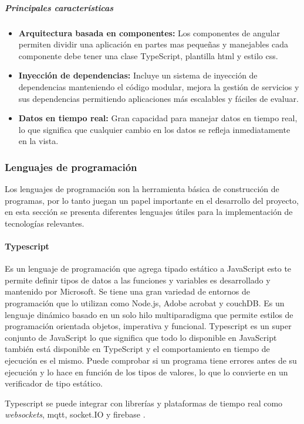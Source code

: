 \subparagraph{Principales características}
\begin{itemize}
    \item \textbf{Arquitectura basada en componentes:} Los componentes de angular permiten dividir una aplicación en partes mas pequeñas y manejables cada componente debe tener una clase TypeScript, plantilla \acrfull{html} y estilo \acrshort{css}.
    \item \textbf{Inyección de dependencias:} Incluye un sistema de inyección de dependencias manteniendo el código modular, mejora la gestión de servicios y sus dependencias permitiendo aplicaciones más escalables y fáciles de evaluar.
    \item \textbf{Datos en tiempo real:} Gran capacidad para manejar datos en tiempo real, lo que significa que cualquier cambio en los datos se refleja inmediatamente en la vista.
\end{itemize}

\subsubsection{Lenguajes de programación}
Los lenguajes de programación son la herramienta básica de construcción de programas, por lo tanto juegan un papel importante en el desarrollo del proyecto, en esta sección se presenta diferentes lenguajes útiles para la implementación de tecnologías relevantes.
\paragraph{Typescript}
Es un lenguaje de programación que agrega tipado estático a JavaScript esto te permite definir tipos de datos a las funciones y variables es desarrollado y mantenido por Microsoft. Se tiene una gran variedad de entornos de programación que lo utilizan como Node.js, Adobe acrobat y couchDB. Es un lenguaje dinámico basado en un solo hilo multiparadigma que permite estilos de programación orientada objetos, imperativa y funcional. Typescript es un super conjunto de JavaScript lo que significa que todo lo disponible en JavaScript también está disponible en TypeScript y el comportamiento en tiempo de ejecución es el mismo. Puede comprobar si un programa tiene errores antes de su ejecución y lo hace en función de los tipos de valores, lo que lo convierte en un verificador de tipo estático.

Typescript se puede integrar con librerías y plataformas de tiempo real como \textit{websockets}, \acrshort{mqtt}, socket.IO y firebase \citep{typescript}.
